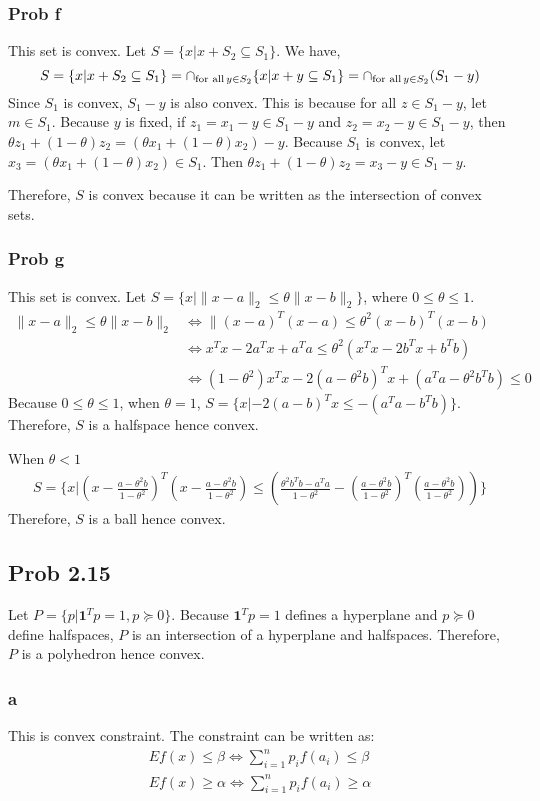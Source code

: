 \documentclass[10pt,a4paper]{article}
\begin{document}
\subsubsection{Prob f}
This set is convex.  Let $S=\{x|x+S_2\subseteq S_1\}$. We have,
$$
S=\{x|x+S_2\subseteq S_1\}=\cap_{\text{for all\,}y\in S_2}\{x|x+y\subseteq S_1\}=\cap_{\text{for all\,}y\in S_2}(S_1-y)
$$
Since $S_1$ is convex, $S_1 - y$ is also convex. This is because for all $z\in S_1-y$, let $ m\in S_1$. Because $y$ is fixed, if $z_1=x_1-y\in S_1-y$ and $z_2=x_2-y\in S_1-y$, then $\theta z_1 + (1-\theta)z_2 = (\theta x_1 + (1-\theta)x_2) - y$. Because $S_1$ is convex, let $x_3=(\theta x_1 + (1-\theta)x_2)\in S_1$. Then $\theta z_1 + (1-\theta)z_2 = x_3-y \in S_1-y$.

Therefore, $S$ is convex because it can be written as the intersection of convex sets.

\subsubsection{Prob g}
This set is convex. Let $S=\{x|\|x-a\|_2\leq \theta\|x-b\|_2\}$, where $0\leq \theta \leq 1$.
\begin{align*}
	\|x-a\|_2\leq \theta\|x-b\|_2 &\Longleftrightarrow\|(x-a)^T(x-a)\leq \theta^2(x-b)^T(x-b)\\
	&\Longleftrightarrow x^Tx-2a^Tx+a^Ta\leq \theta^2(x^Tx-2b^Tx+b^Tb)\\
	&\Longleftrightarrow (1-\theta^2)x^Tx - 2(a-\theta^2b)^Tx+(a^Ta-\theta^2b^Tb)\leq0
\end{align*}
Because $0\leq \theta \leq 1$, when $\theta=1$, $S=\{x|- 2(a-b)^Tx\leq-(a^Ta-b^Tb)\}$. Therefore, $S$ is a halfspace hence convex.

When $\theta<1$
\begin{align*}
	S=\{x|(x-\frac{a-\theta^2b}{1-\theta^2})^T(x-\frac{a-\theta^2b}{1-\theta^2})\leq(\frac{\theta^2b^Tb-a^Ta}{1-\theta^2}-(\frac{a-\theta^2b}{1-\theta^2})^T(\frac{a-\theta^2b}{1-\theta^2}))\}
\end{align*}
Therefore, $S$ is a ball hence convex.


\subsection{Prob 2.15}
Let $P=\{p|\mathbf{1}^Tp=1, p\succeq0\}$. Because $\mathbf{1}^Tp=1$ defines a hyperplane and $p\succeq0$ define halfspaces, $P$ is an intersection of a hyperplane and halfspaces. Therefore, $P$ is a polyhedron hence convex.
\subsubsection{a}
This is convex constraint. The constraint can be written as:
\begin{align}
	\label{constraint:2.15.a.1}
	Ef(x)\leq \beta \Longleftrightarrow \sum_{i=1}^{n}p_if(a_i)\leq \beta\\
	\label{constraint:2.15.a.2}
	Ef(x)\geq \alpha \Longleftrightarrow \sum_{i=1}^{n}p_if(a_i)\geq \alpha
\end{align}
\end{document}
